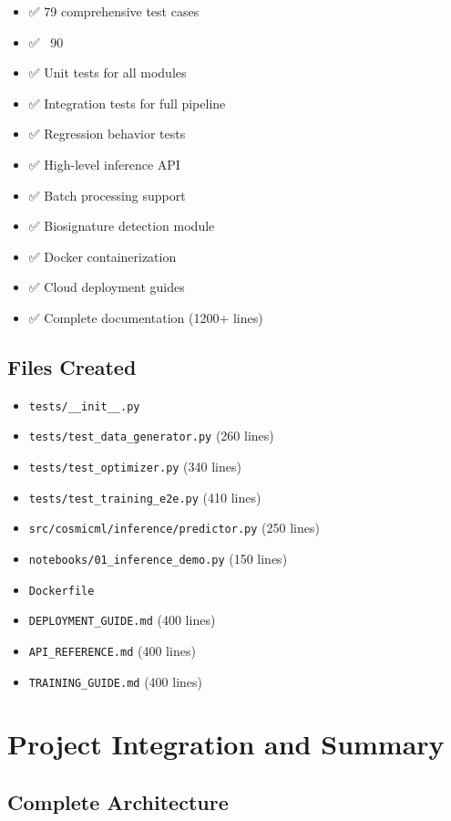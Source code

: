 \documentclass[12pt,a4paper,oneside]{report}
\begin{document}
\begin{itemize}
    \item ✅ 79 comprehensive test cases
    \item ✅ ~90%
    \item ✅ Unit tests for all modules
    \item ✅ Integration tests for full pipeline
    \item ✅ Regression behavior tests
    \item ✅ High-level inference API
    \item ✅ Batch processing support
    \item ✅ Biosignature detection module
    \item ✅ Docker containerization
    \item ✅ Cloud deployment guides
    \item ✅ Complete documentation (1200+ lines)
\end{itemize}

\section{Files Created}

\begin{itemize}
    \item \texttt{tests/\_\_init\_\_.py}
    \item \texttt{tests/test\_data\_generator.py} (260 lines)
    \item \texttt{tests/test\_optimizer.py} (340 lines)
    \item \texttt{tests/test\_training\_e2e.py} (410 lines)
    \item \texttt{src/cosmicml/inference/predictor.py} (250 lines)
    \item \texttt{notebooks/01\_inference\_demo.py} (150 lines)
    \item \texttt{Dockerfile}
    \item \texttt{DEPLOYMENT\_GUIDE.md} (400 lines)
    \item \texttt{API\_REFERENCE.md} (400 lines)
    \item \texttt{TRAINING\_GUIDE.md} (400 lines)
\end{itemize}

\chapter{Project Integration and Summary}

\section{Complete Architecture}
\end{document}

